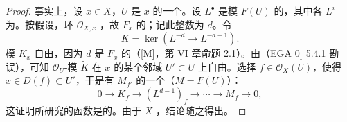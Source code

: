 \begin{proof}
事实上，设 $x\in X$，$U$ 是 $x$ 的一个。设 $L^{\bullet}$ 是模 $F(U)$ 的，其中各 $L^i$ 为。按假设，环 $\mathscr O_{X,x}$ ，故 $F_x$ 的；记此整数为 $d$。令
\[K=\ker(L^{-d}\longrightarrow L^{-d+1}).\]
模 $K_x$ 自由，因为 $d$ 是 $F_x$ 的（[M]，第 VI 章命题 2.1）。由（EGA $0_{\mathrm I}$ 5.4.1 勘误），可知 $\mathscr O_U$-模 $\widetilde K$ 在 $x$ 的某个邻域 $U'\subset U$ 上自由。选择 $f\in\mathscr O_X(U)$，使得 $x\in D(f)\subset U'$，于是有 $M_{f'}$ 的一个（$M=F(U)$）：
\[0\longrightarrow K_f\longrightarrow(L^{d-1})_f\longrightarrow\cdots\longrightarrow M_f\longrightarrow0,\]
这证明所研究的函数是的。由于 $X$ ，结论随之得出。
\end{proof}
